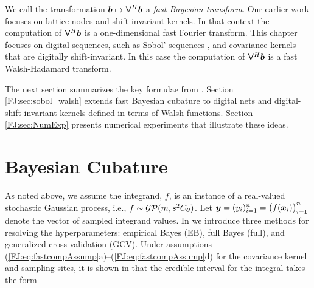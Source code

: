 \documentclass[graybox,footinfo]{svmult}
\begin{document}
We call the transformation ${\boldsymbol{b}} \mapsto \mathsf{V}^H {\boldsymbol{b}}$ a \emph{fast Bayesian transform}. Our earlier work \cite{RatHic19a} focuses on lattice nodes and shift-invariant kernels. In that context the computation of $\mathsf{V}^H {\boldsymbol{b}}$ is a one-dimensional fast Fourier transform.  This chapter focuses on digital sequences, such as Sobol' sequences \cite{Sob67}, and covariance kernels that are digitally shift-invariant.  In this case the computation of $\mathsf{V}^H {\boldsymbol{b}}$ is a fast Walsh-Hadamard transform. 



The next section summarizes the key formulae from \cite{RatHic19a}.  Section \ref{FJ:sec:sobol_walsh} extends fast Bayesian cubature to digital nets and digital-shift invariant kernels defined in terms of Walsh functions.  Section \ref{FJ:sec:NumExp} presents numerical experiments that illustrate these ideas.  




\section{Bayesian Cubature}
\label{FJ:sec:BC} 




As noted above, we assume the integrand, $f$, is an instance of a real-valued stochastic Gaussian process, i.e., $f \sim \mathcal{GP}(m,s^2 C_{\boldsymbol{\theta}})$.  Let $\boldsymbol{y} = (y_i)_{i=1}^n = \bigl( f({\boldsymbol{x}}_i) \bigr)_{i=1}^n$ denote the vector of sampled integrand values.  In \cite{RatHic19a} we introduce three methods for resolving the hyperparameters:  empirical Bayes (EB), full Bayes (full), and generalized cross-validation (GCV).  Under assumptions (\ref{FJ:eq:fastcompAssump}a)--(\ref{FJ:eq:fastcompAssump}d) for the covariance kernel and sampling sites, it is shown in \cite[Theorem 2]{RatHic19a} that the credible interval for the integral takes the form
\end{document}
